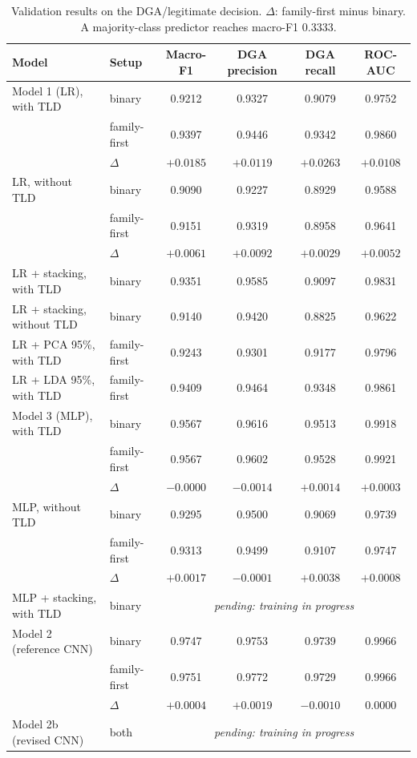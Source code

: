 \documentclass[11pt]{article}
\begin{document}
\begin{table}[h]
\centering
\footnotesize
\caption{Validation results on the DGA/legitimate decision. $\Delta$:
family-first minus binary. A majority-class predictor reaches macro-F1 0.3333.}
\label{tab:results}
\begin{tabular}{@{}llcccc@{}}
\toprule
Model & Setup & Macro-F1 & DGA precision & DGA recall & ROC-AUC \\
\midrule
Model 1 (LR), with TLD & binary & 0.9212 & 0.9327 & 0.9079 & 0.9752 \\
 & family-first & 0.9397 & 0.9446 & 0.9342 & 0.9860 \\
 & $\Delta$ & $+0.0185$ & $+0.0119$ & $+0.0263$ & $+0.0108$ \\
LR, without TLD & binary & 0.9090 & 0.9227 & 0.8929 & 0.9588 \\
 & family-first & 0.9151 & 0.9319 & 0.8958 & 0.9641 \\
 & $\Delta$ & $+0.0061$ & $+0.0092$ & $+0.0029$ & $+0.0052$ \\
\midrule
LR + stacking, with TLD & binary & 0.9351 & 0.9585 & 0.9097 & 0.9831 \\
LR + stacking, without TLD & binary & 0.9140 & 0.9420 & 0.8825 & 0.9622 \\
LR + PCA 95\%, with TLD & family-first & 0.9243 & 0.9301 & 0.9177 & 0.9796 \\
LR + LDA 95\%, with TLD & family-first & 0.9409 & 0.9464 & 0.9348 & 0.9861 \\
\midrule
Model 3 (MLP), with TLD & binary & 0.9567 & 0.9616 & 0.9513 & 0.9918 \\
 & family-first & 0.9567 & 0.9602 & 0.9528 & 0.9921 \\
 & $\Delta$ & $-0.0000$ & $-0.0014$ & $+0.0014$ & $+0.0003$ \\
MLP, without TLD & binary & 0.9295 & 0.9500 & 0.9069 & 0.9739 \\
 & family-first & 0.9313 & 0.9499 & 0.9107 & 0.9747 \\
 & $\Delta$ & $+0.0017$ & $-0.0001$ & $+0.0038$ & $+0.0008$ \\
MLP + stacking, with TLD & binary & \multicolumn{4}{c}{\emph{pending: training in progress}} \\
\midrule
Model 2 (reference CNN) & binary & 0.9747 & 0.9753 & 0.9739 & 0.9966 \\
 & family-first & 0.9751 & 0.9772 & 0.9729 & 0.9966 \\
 & $\Delta$ & $+0.0004$ & $+0.0019$ & $-0.0010$ & $0.0000$ \\
\midrule
Model 2b (revised CNN) & both & \multicolumn{4}{c}{\emph{pending: training in progress}} \\
\bottomrule
\end{tabular}
\end{table}
\end{document}
